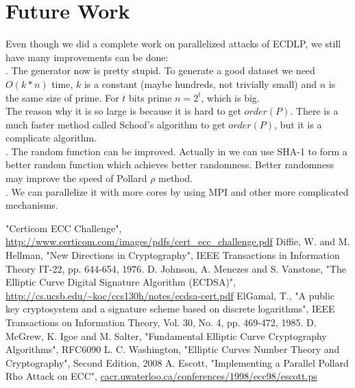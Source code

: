 \documentclass[10pt,a4paper]{article}
\begin{document}
\section{Future Work}
\indent Even though we did a complete work on parallelized attacks of ECDLP, we still have many improvements can be done: \\
. The generator now is pretty stupid. To generate a good dataset we need $O(k * n)$ time, $k$ is a constant (maybe hundreds, not trivially small) and $n$ is the same size of prime. For $t$ bits prime $n = 2^t$, which is big. \\
\indent The reason why it is so large is because it is hard to get $order(P)$. There is a much faster method called Schoof's algorithm to get $order(P)$, but it is a complicate algorithm. \\
. The random function can be improved. Actually in \cite{CERTICOM} we can use SHA-1 to form a better random function which achieves better randomness. Better randomness may improve the speed of Pollard $\rho$ method.\\
. We can parallelize it with more cores by using MPI and other more complicated mechanisms. 
\begin{thebibliography}{}
	 "Certicom ECC Challenge", \url{http://www.certicom.com/images/pdfs/cert_ecc_challenge.pdf}
     Diffie, W. and M. Hellman, "New Directions in Cryptography", IEEE Transactions in Information Theory IT-22, pp. 644-654, 1976.	
	 D. Johnson, A.	Menezes and S. Vanstone, "The Elliptic Curve Digital Signature Algorithm (ECDSA)", \url{http://cs.ucsb.edu/~koc/ccs130h/notes/ecdsa-cert.pdf}
     ElGamal, T., "A public key cryptosystem and a signature scheme based on discrete logarithms", IEEE Transactions on Information Theory, Vol. 30, No. 4, pp. 469-472, 1985.
	 D. McGrew, K. Igoe and M. Salter, "Fundamental Elliptic Curve Cryptography Algorithms", RFC6090
	 L. C. Washington, "Elliptic Curves Number Theory and Cryptography", Second Edition, 2008
	 A. Escott, "Implementing a
Parallel Pollard Rho Attack on ECC", \url{cacr.uwaterloo.ca/conferences/1998/ecc98/escott.ps}
    \end{thebibliography}
\end{document}
